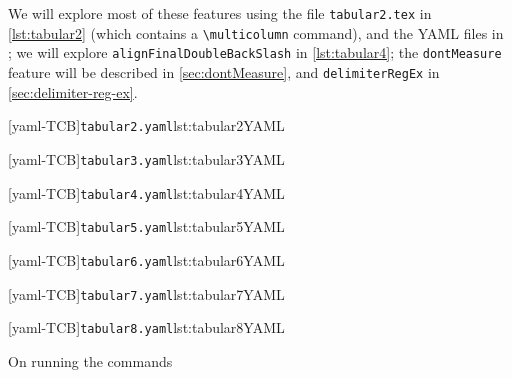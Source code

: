 \documentclass[10pt]{article}
\begin{document}
 \begin{example}
 We will explore most of these features using the file \texttt{tabular2.tex} in
 \cref{lst:tabular2} (which contains a \lstinline!\multicolumn! command), and the YAML
 files in ; we will explore
 \texttt{alignFinalDoubleBackSlash} in \cref{lst:tabular4}; the \texttt{dontMeasure}
 feature will be described in \cref{sec:dontMeasure}, and \texttt{delimiterRegEx} in
 \cref{sec:delimiter-reg-ex}.

 \begin{minipage}{.45\textwidth}
  [yaml-TCB]{\texttt{tabular2.yaml}}{lst:tabular2YAML}
 \end{minipage}%
 \hfill
 \begin{minipage}{.48\textwidth}
  [yaml-TCB]{\texttt{tabular3.yaml}}{lst:tabular3YAML}
 \end{minipage}%

 \begin{minipage}{.45\textwidth}
  [yaml-TCB]{\texttt{tabular4.yaml}}{lst:tabular4YAML}
 \end{minipage}%
 \hfill
 \begin{minipage}{.48\textwidth}
  [yaml-TCB]{\texttt{tabular5.yaml}}{lst:tabular5YAML}
 \end{minipage}%

 \begin{minipage}{.45\textwidth}
  [yaml-TCB]{\texttt{tabular6.yaml}}{lst:tabular6YAML}
 \end{minipage}%
 \hfill
 \begin{minipage}{.48\textwidth}
  [yaml-TCB]{\texttt{tabular7.yaml}}{lst:tabular7YAML}
 \end{minipage}%

 \begin{minipage}{.48\textwidth}
  [yaml-TCB]{\texttt{tabular8.yaml}}{lst:tabular8YAML}
 \end{minipage}%

 On running the commands  


\end{example}
\end{document}
